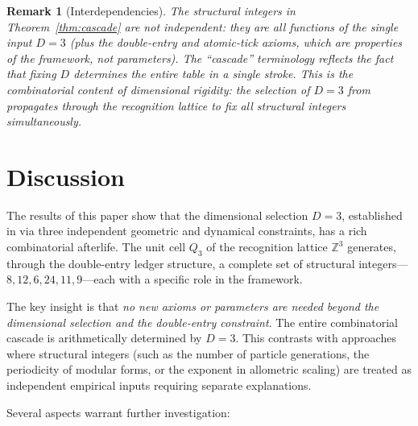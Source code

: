 \documentclass[11pt]{article}
\newtheorem{remark}[theorem]{Remark}
\newcommand{\Z}{\mathbb{Z}}
\begin{document}
\begin{remark}[Interdependencies]\label{rem:interdependencies}
The structural integers in Theorem~\ref{thm:cascade} are not independent: they are all functions of the single input $D = 3$ (plus the double-entry and atomic-tick axioms, which are properties of the \emph{framework}, not parameters).
The ``cascade'' terminology reflects the fact that fixing $D$ determines the entire table in a single stroke.
This is the combinatorial content of dimensional rigidity: the selection of $D = 3$ from \cite{PardoGuerraThapa2026} propagates through the recognition lattice to fix all structural integers simultaneously.
\end{remark}

\section{Discussion}
\label{sec:discussion}

The results of this paper show that the dimensional selection $D = 3$, established in \cite{PardoGuerraThapa2026} via three independent geometric and dynamical constraints, has a rich combinatorial afterlife.
The unit cell $Q_3$ of the recognition lattice $\Z^3$ generates, through the double-entry ledger structure, a complete set of structural integers---$8, 12, 6, 24, 11, 9$---each with a specific role in the framework.

The key insight is that \emph{no new axioms or parameters are needed beyond the dimensional selection and the double-entry constraint}.
The entire combinatorial cascade is arithmetically determined by $D = 3$.
This contrasts with approaches where structural integers (such as the number of particle generations, the periodicity of modular forms, or the exponent in allometric scaling) are treated as independent empirical inputs requiring separate explanations.

Several aspects warrant further investigation:
\end{document}
